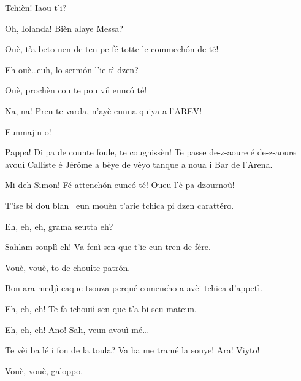 \begin{drama}
\Iolandaspeaks {} Tchièn! Iaou t'i?


\Cienspeaks {} Oh, Iolanda! Bièn alaye Messa?

\Iolandaspeaks Ouè, t’a beto-nen de ten pe fé totte le commech\'on de té!

\Cienspeaks Eh ouè\ldots euh, lo serm\'on l'ie-tì dzen?

\Iolandaspeaks  Ouè, prochèn cou te pou viì eunc\'o té!

\Cienspeaks Na, na! Pren-te varda, n’ayè eunna quiya a l’AREV!

\Iolandaspeaks Eunmajin-o!

\Simonspeaks Pappa! Di pa de counte foule, te cougnissèn! Te passe de-z-aoure é de-z-aoure avouì Calliste é Jérôme a bèye de vèyo tanque a noua i Bar de l’Arena.

\Cienspeaks Mi deh Simon! Fé attench\'on eunc\'o té! Oueu l’è pa dzournoù!

\Iolandaspeaks T’ise bi dou blan \vino\ eun mouèn t’arie tchica pi dzen carattéro.

\Sahlammspeaks {}  Eh, eh, eh, grama seutta eh?

\Cienspeaks Sahlam souplì eh! Va fenì sen que t’ie eun tren de fére.

\Sahlammspeaks Vouè, vouè, to de chouite patr\'on.


\Cienspeaks {} Bon ara medjì caque tsouza perqué comencho a avèi tchica d’appetì.

\Sahlammspeaks {} Eh, eh, eh! Te fa ichouiì sen que t’a bi seu mateun. 


\Cienspeaks {} Eh, eh, eh! Ano! Sah, veun avouì mé\ldots


\Cienspeaks {} Te vèi ba lé i fon de la toula? Va ba me tramé la souye! Ara! Viyto! 

\Sahlammspeaks Vouè, vouè, galoppo\galoppe.


\end{drama}
